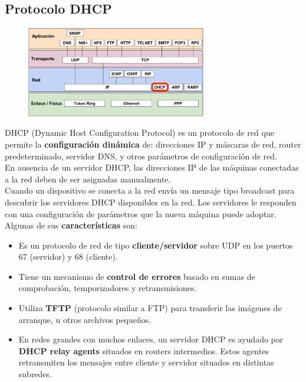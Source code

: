 \begin{onepage}
\section{Protocolo DHCP}
\begin{figure}[H]
    \centering
    \includegraphics[width=0.7\textwidth]{img/DHCP.png}
\end{figure}

DHCP (Dynamic Host Configuration Protocol) es un protocolo de red que permite la \textbf{configuración dinámica} de: direcciones IP y máscaras de red, router predeterminado, servidor DNS, y otros parámetros de configuración de red.\\

En ausencia de un servidor DHCP, las direcciones IP de las máquinas conectadas a la red deben de ser asignadas manualmente.\\

Cuando un dispositivo se conecta a la red envía un mensaje tipo broadcast para descubrir los servidores DHCP disponibles en la red. Los servidores le responden con una configuración de parámetros que la nueva máquina puede adoptar.\\

Algunas de sus \textbf{características} son:
\begin{itemize}
    \item Es un protocolo de red de tipo \textbf{cliente/servidor} sobre UDP en los puertos 67 (servidor) y 68
(cliente).
    \item Tiene un mecanismo de \textbf{control de errores} basado en sumas de comprobación, temporizadores y retransmisiones.
    \item Utiliza \textbf{TFTP} (protocolo similar a FTP) para transferir las imágenes de arranque, u otros archivos pequeños.
    \item En redes grandes con muchos enlaces, un servidor DHCP es ayudado por \textbf{DHCP relay agents} situados en routers intermedios. Estos agentes retransmiten los mensajes entre cliente y servidor situados en distintas subredes.
\end{itemize}
\end{onepage}
